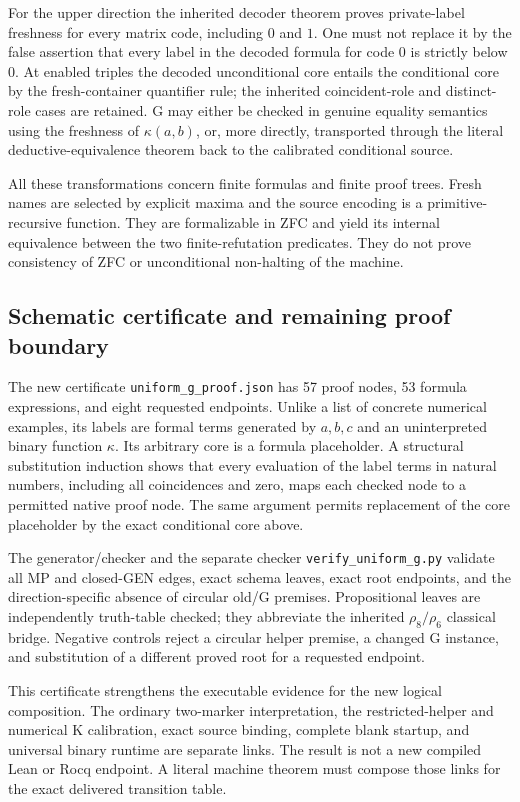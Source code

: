 For the upper direction the inherited decoder theorem proves private-label
freshness for every matrix code, including $0$ and $1$. One must not replace
it by the false assertion that every label in the decoded formula for code
$0$ is strictly below $0$. At enabled triples the decoded unconditional
core entails the conditional core by the fresh-container quantifier rule;
the inherited coincident-role and distinct-role cases are retained. G may
either be checked in genuine equality semantics using the freshness of
$\kappa(a,b)$, or, more directly, transported through the literal
deductive-equivalence theorem back to the calibrated conditional source.

All these transformations concern finite formulas and finite proof trees.
Fresh names are selected by explicit maxima and the source encoding is a
primitive-recursive function. They are formalizable in ZFC and yield its
internal equivalence between the two finite-refutation predicates. They do
not prove consistency of ZFC or unconditional non-halting of the machine.

\subsection{Schematic certificate and remaining proof boundary}

The new certificate \texttt{uniform\_g\_proof.json} has 57 proof nodes,
53 formula expressions, and eight requested endpoints. Unlike a list of
concrete numerical examples, its labels are formal terms generated by
$a,b,c$ and an uninterpreted binary function $\kappa$. Its arbitrary core
is a formula placeholder. A structural substitution induction shows that
every evaluation of the label terms in natural numbers, including all
coincidences and zero, maps each checked node to a permitted native proof
node. The same argument permits replacement of the core placeholder by the
exact conditional core above.

The generator/checker and the separate checker
\texttt{verify\_uniform\_g.py} validate all MP and closed-GEN edges, exact
schema leaves, exact root endpoints, and the direction-specific absence of
circular old/G premises. Propositional leaves are independently truth-table
checked; they abbreviate the inherited $\rho_8/\rho_6$ classical bridge.
Negative controls reject a circular helper premise, a changed G instance,
and substitution of a different proved root for a requested endpoint.

This certificate strengthens the executable evidence for the new logical
composition. The ordinary two-marker interpretation, the restricted-helper
and numerical K calibration, exact source binding, complete blank startup,
and universal binary runtime are separate links. The result is not a new
compiled Lean or Rocq endpoint. A literal machine theorem must compose those
links for the exact delivered transition table.
